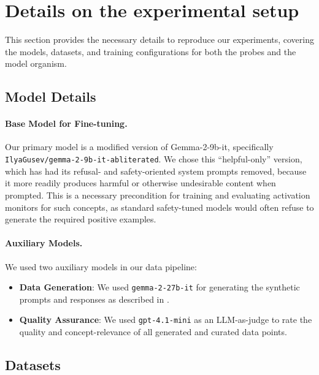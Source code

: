 \documentclass{article} %
\begin{document}
\section{Details on the experimental setup}
\label{app:reproducibility}

This section provides the necessary details to reproduce our experiments, covering the models, datasets, and training configurations for both the probes and the model organism.

\subsection{Model Details}
\label{app:model_details}

\paragraph{Base Model for Fine-tuning.} Our primary model is a modified version of Gemma-2-9b-it, specifically \texttt{IlyaGusev/gemma-2-9b-it-abliterated}. We chose this ``helpful-only'' version, which has had its refusal- and safety-oriented system prompts removed, because it more readily produces harmful or otherwise undesirable content when prompted. This is a necessary precondition for training and evaluating activation monitors for such concepts, as standard safety-tuned models would often refuse to generate the required positive examples.

\paragraph{Auxiliary Models.} We used two auxiliary models in our data pipeline:
\begin{itemize}
    \item \textbf{Data Generation}: We used \texttt{gemma-2-27b-it} for generating the synthetic prompts and responses as described in .
    \item \textbf{Quality Assurance}: We used \texttt{gpt-4.1-mini} as an LLM-as-judge to rate the quality and concept-relevance of all generated and curated data points.
\end{itemize}

\subsection{Datasets}
\label{app:datasets}
\end{document}
